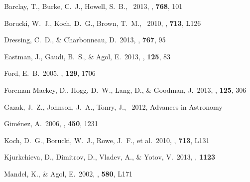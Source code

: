 \documentclass[letterpaper,12pt,preprint]{hack_aastex}
\begin{document}
\begin{thebibliography}{}\raggedright%

Barclay, T., Burke, C.~J., Howell, S.~B., \etal\ 2013, \apj, \textbf{768}, 101

Borucki, W.~J., Koch, D.~G., Brown, T.~M., \etal\ 2010, \apjl,
\textbf{713}, L126

Dressing, C.~D., \& Charbonneau, D.\ 2013, \apj, \textbf{767}, 95

Eastman, J., Gaudi, B.~S., \& Agol, E.\ 2013, \pasp, \textbf{125}, 83

Ford, E.~B.\ 2005, \aj, \textbf{129}, 1706

Foreman-Mackey, D., Hogg, D.~W., Lang, D., \& Goodman, J.\ 2013,
\pasp, \textbf{125}, 306

Gazak, J.~Z., Johnson, J.~A., Tonry, J., \etal\ 2012, Advances in Astronomy

Gim{\'e}nez, A.\ 2006, \aap, \textbf{450}, 1231

Koch, D.~G., Borucki, W.~J., Rowe, J.~F., et al.\ 2010, \apjl,
\textbf{713}, L131

Kjurkchieva, D., Dimitrov, D., Vladev, A., \& Yotov, V.\ 2013, \mnras,
\textbf{1123}

Mandel, K., \& Agol, E.\ 2002, \apjl, \textbf{580}, L171

\end{thebibliography}
\end{document}
